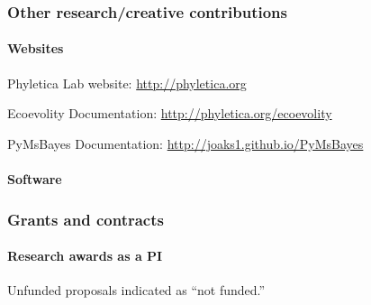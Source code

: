 


\subsubsection{Other research/creative contributions}
 
\paragraph{Websites}
\begin{tightItemize}
    \item Phyletica Lab website: \url{http://phyletica.org}
    \item Ecoevolity Documentation: \url{http://phyletica.org/ecoevolity}
    \item PyMsBayes Documentation: \url{http://joaks1.github.io/PyMsBayes}
\end{tightItemize}

\paragraph{Software}


\subsubsection{Grants and contracts}

\paragraph{Research awards as a PI}
Unfunded proposals indicated as ``not funded.''



